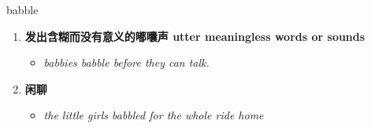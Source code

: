 
\begin{frame}
{\huge babble}
\begin{center}
\begin{enumerate}\Large
  \item \textbf{发出含糊而没有意义的嘟囔声 utter meaningless words or sounds}
  \begin{itemize}
    \item \em{\Large{babbies babble before they can talk.}}
  \end{itemize}
  \item \textbf{闲聊}
  \begin{itemize}
    \item \em{\Large{the little girls babbled for the whole ride home}}
  \end{itemize}
\end{enumerate}
\end{center}
\end{frame}
